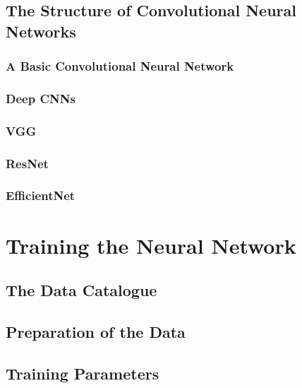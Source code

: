 \documentclass[12pt]{article}
\numberwithin{equation}{subsection}
\begin{document}
\subsection{The Structure of Convolutional Neural Networks}
\label{CNN Structure}

\subsubsection{A Basic Convolutional Neural Network}
\label{basic_cnn}

\subsubsection{Deep CNNs}

\subsubsection*{VGG}

\subsubsection*{ResNet}

\subsubsection*{EfficientNet}


\newpage

\section{Training the Neural Network}
\label{training}

\subsection{The Data Catalogue}
\label{data_catalogue}

\subsection{Preparation of the Data}
\label{data_prep}

\subsection{Training Parameters}
\label{train_params}

\newpage
\end{document}
